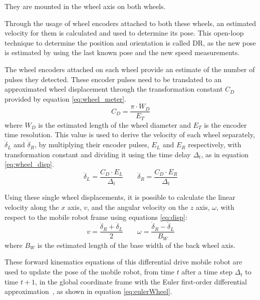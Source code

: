 They are mounted in the wheel axis on both wheels.

\noindent
Through the usage of wheel encoders attached to both these wheels, an estimated velocity for them is calculated and used to determine its pose.
This open-loop technique to determine the position and orientation is called \gls{DR}, as the new pose is estimated by using the last known pose and the new speed measurements.

The wheel encoders attached on each wheel provide an estimate of the number of pulses they detected. These encoder pulses need to be translated to an approximated wheel displacement through the transformation constant $C_{D}$ provided by equation \ref{eq:wheel_meter}.
\begin{equation}
C_{D} = \frac{\pi \cdot W_D }{E_T}
\label{eq:wheel_meter}
\end{equation} where $W_D$ is the estimated length of the wheel diameter and $E_T$ is the encoder time resolution.
This value is used to derive the velocity of each wheel separately, $\dot \delta_L$ and $\dot \delta_R$, by multiplying their encoder pulses, $E_L$ and  $E_R$ respectively, with transformation constant and dividing it using the time delay $\Delta_t$, as in equation \ref{eq:wheel_disp}.
\begin{equation}
\dot \delta_{L} = \frac{C_D \cdot E_L}{\Delta_t}  \qquad
\dot \delta_{R} = \frac{C_D \cdot E_R}{\Delta_t}
\label{eq:wheel_disp}
\end{equation}

Using these single wheel displacements, it is possible to calculate the linear velocity along the $x$ axis, $v$, and the angular velocity on the $z$ axis, $\omega$, with respect to the mobile robot frame using equations \ref{eq:disp}:
\begin{equation}
    v =\frac{\dot \delta_{R} + \dot \delta_{L} }{2} \qquad \omega = \frac{\dot \delta _{R} - \dot \delta_{L}}{B_W}
\label{eq:disp}
\end{equation} where $B_W$ is the estimated length of the base width of the back wheel axis.


These forward kinematics equations of this differential drive mobile robot are used to update the pose of the mobile robot, from time $t$ after a time step $\Delta_t$ to time $t+1$, in the global coordinate frame with the Euler first-order differential approximation~\cite{braun_first-order_1993}, as shown in equation \ref{eq:eulerWheel}.

